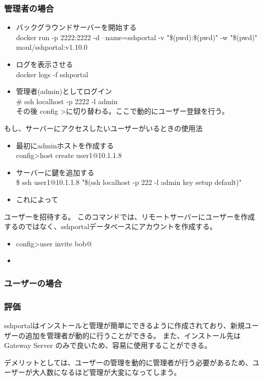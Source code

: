 \documentclass[12pt,a4paper,titlepage]{jsarticle}
\begin{document}
\subsubsection*{管理者の場合}
\begin{itemize}

    \item バックグラウンドサーバーを開始する \mbox{}\\docker run -p 2222:2222 -d --name=sshportal -v "\$(pwd):\$(pwd)" -w "\$(pwd)" 
    moul/sshportal:v1.10.0
    \item ログを表示させる\mbox{}\\docker logs -f sshportal
    \item 管理者(admin)としてログイン\mbox{}\\ \# ssh localhost -p 2222 -l admin\\その後 config \textgreater に切り替わる。ここで動的にユーザー登録を行う。
    
\end{itemize}
もし、サーバーにアクセスしたいユーザーがいるときの使用法
\begin{itemize}
    \item 最初にadminホストを作成する\mbox{}\\ config\textgreater  host create user1@10.1.1.8
    \item サーバーに鍵を追加する\mbox{} \\ \$ ssh user1@10.1.1.8 "\$(ssh localhost -p 222 -l admin key setup default)"
    \item これによって
\end{itemize}
ユーザーを招待する。
このコマンドでは、リモートサーバーにユーザーを作成するのではなく、sshportalデータベースにアカウントを作成する。
\begin{itemize}
    \item config\textgreater user invite bob@
    \item 
\end{itemize}


\subsubsection*{ユーザーの場合}


\subsubsection*{評価}
sshportalはインストールと管理が簡単にできるように作成されており、新規ユーザーの追加を管理者が動的に行うことができる。
また、インストール先はGateway Server のみで良いため、容易に使用することができる。
\par デメリットとしては、ユーザーの管理を動的に管理者が行う必要があるため、ユーザーが大人数になるほど管理が大変になってしまう。
\end{document}
